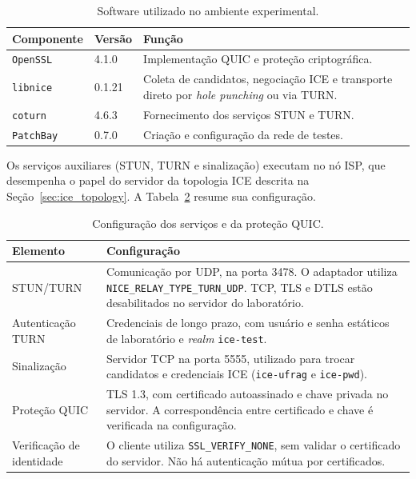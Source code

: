 \begin{table}[htbp]
    \centering
    \normalsize
    \caption{Software utilizado no ambiente experimental.}
    \label{tab:experimental_software}
    \begin{tabular}{@{}p{}p{}p{}@{}}
        \toprule
        \textbf{Componente} & \textbf{Versão} & \textbf{Função} \\
        \midrule
        \texttt{OpenSSL} & 4.1.0 &
        Implementação QUIC e proteção criptográfica. \\
        \texttt{libnice} & 0.1.21 &
        Coleta de candidatos, negociação ICE e transporte
        direto por \textit{hole punching} ou via TURN. \\
        \texttt{coturn} & 4.6.3 &
        Fornecimento dos serviços STUN e TURN. \\
        \texttt{PatchBay} & 0.7.0 &
        Criação e configuração da rede de testes. \\
        \bottomrule
    \end{tabular}
\end{table}

Os serviços auxiliares (STUN, TURN e sinalização) executam no nó ISP, que desempenha o papel do servidor da topologia ICE descrita na Seção~\ref{sec:ice_topology}. A Tabela~\ref{tab:experimental_services} resume sua configuração.

\begin{table}[htbp]
    \centering
    \normalsize
    \caption{Configuração dos serviços e da proteção QUIC.}
    \label{tab:experimental_services}
    \begin{tabular}{@{}p{}p{}@{}}
        \toprule
        \textbf{Elemento} & \textbf{Configuração} \\
        \midrule
        STUN/TURN &
        Comunicação por UDP, na porta 3478.
        O adaptador utiliza
        \texttt{NICE\_RELAY\_TYPE\_TURN\_UDP}.
        TCP, TLS e DTLS estão desabilitados no servidor
        do laboratório. \\
        Autenticação TURN &
        Credenciais de longo prazo, com usuário e senha
        estáticos de laboratório e \textit{realm}
        \texttt{ice-test}. \\
        Sinalização &
        Servidor TCP na porta 5555, utilizado para trocar
        candidatos e credenciais ICE
        (\texttt{ice-ufrag} e \texttt{ice-pwd}). \\
        Proteção QUIC &
        TLS 1.3, com certificado autoassinado e chave
        privada no servidor. A correspondência entre
        certificado e chave é verificada na configuração. \\
        Verificação de identidade &
        O cliente utiliza \texttt{SSL\_VERIFY\_NONE},
        sem validar o certificado do servidor.
        Não há autenticação mútua por certificados. \\
        \bottomrule
    \end{tabular}
\end{table}

